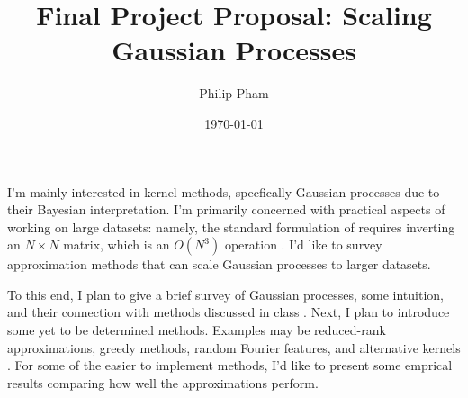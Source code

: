 \documentclass[letterpaper]{article}
\author{Philip Pham}
\title{Final Project Proposal: Scaling Gaussian Processes}
\date{\today}
\begin{document}
\maketitle

I'm mainly interested in kernel methods, specfically Gaussian processes due to
their Bayesian interpretation. I'm primarily concerned with practical aspects of
working on large datasets: namely, the standard formulation of requires
inverting an $N \times N$ matrix, which is an $O(N^3)$ operation
\citep{gpbook}. I'd like to survey approximation methods that can scale Gaussian
processes to larger datasets.

To this end, I plan to give a brief survey of Gaussian processes, some
intuition, and their connection with methods discussed in class
\citep{visualgp}. Next, I plan to introduce some yet to be determined
methods. Examples may be reduced-rank approximations, greedy methods, random
Fourier features, and alternative kernels \citep{ntk}. For some of the easier to
implement methods, I'd like to present some emprical results comparing how well
the approximations perform.


\end{document}

